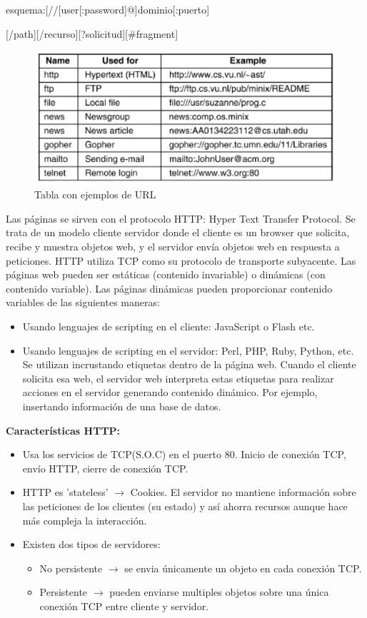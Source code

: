 \documentclass[a4paper,11pt]{article}
\begin{document}
esquema:[//[user[:password]@]dominio[:puerto]

[/path][/recurso][?solicitud][\#fragment] 

\begin{figure}[h]
\centering
\caption{Tabla con ejemplos de URL}
\includegraphics[scale=1,width=1\textwidth]{tabla_navegacion_web.png}
\end{figure}

Las páginas se sirven con el protocolo HTTP: Hyper Text Transfer Protocol. Se trata de un modelo cliente servidor donde el cliente es un browser que solicita, recibe y muestra objetos web, y el servidor envía objetos web en respuesta a peticiones. HTTP utiliza TCP como su protocolo de transporte subyacente. Las páginas web pueden ser estáticas (contenido invariable) o dinámicas (con contenido variable). Las páginas dinámicas pueden proporcionar contenido variables de las siguientes maneras:

\begin{itemize}
\item Usando lenguajes de scripting en el cliente: JavaScript o Flash etc.
\item Usando lenguajes de scripting en el servidor: Perl, PHP, Ruby, Python, etc. Se utilizan incrustando etiquetas dentro de la página web. Cuando el cliente solicita esa web, el servidor web interpreta estas etiquetas para realizar acciones en el servidor generando contenido dinámico. Por ejemplo, insertando información de una base de datos.
\end{itemize}


\textbf{Características HTTP:}
\begin{itemize}
\item Usa los servicios de TCP(S.O.C) en el puerto 80. Inicio de conexión TCP, envío HTTP, cierre de conexión TCP.

\item HTTP es 'stateless' $\rightarrow$ Cookies. El servidor no mantiene información sobre las peticiones de los clientes (su estado) y así ahorra recursos aunque hace más compleja la interacción.

\item Existen dos tipos de servidores:
	
	\begin{itemize}
		\item No persistente $\rightarrow$ se envia únicamente un objeto en cada conexión TCP.
		\item Persistente $\rightarrow$ pueden enviarse multiples objetos sobre una única conexión TCP entre cliente y servidor.
	\end{itemize}
\end{itemize}
\end{document}
